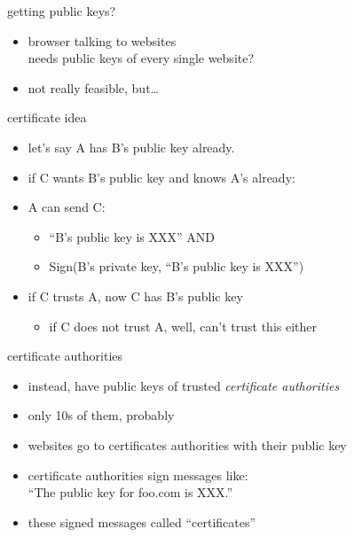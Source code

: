 \begin{frame}{getting public keys?}
    \begin{itemize}
    \item browser talking to websites \\
    needs public keys of every single website?
    \vspace{.5cm}
    \item not really feasible, but\ldots
    \end{itemize}
\end{frame}

\begin{frame}{certificate idea}
    \begin{itemize}
        \item let's say A has B's public key already.
        \item if C wants B's public key and knows A's already:
            \vspace{.5cm}
        \item A can send C:
            \begin{itemize}
            \item ``B's public key is XXX'' AND
            \item Sign(B's private key, ``B's public key is XXX'')
            \end{itemize}
        \item if C trusts A, now C has B's public key
            \begin{itemize}
            \item if C does not trust A, well, can't trust this either
            \end{itemize}
    \end{itemize}
\end{frame}

\begin{frame}{certificate authorities}
    \begin{itemize}
    \item instead, have public keys of trusted \textit{certificate authorities}
    \item only 10s of them, probably
    \vspace{.5cm}
    \item websites go to certificates authorities with their public key
    \item certificate authorities sign messages like: \\
        ``The public key for foo.com is XXX.''
    \item these signed messages called ``certificates''
    \end{itemize}
\end{frame}


